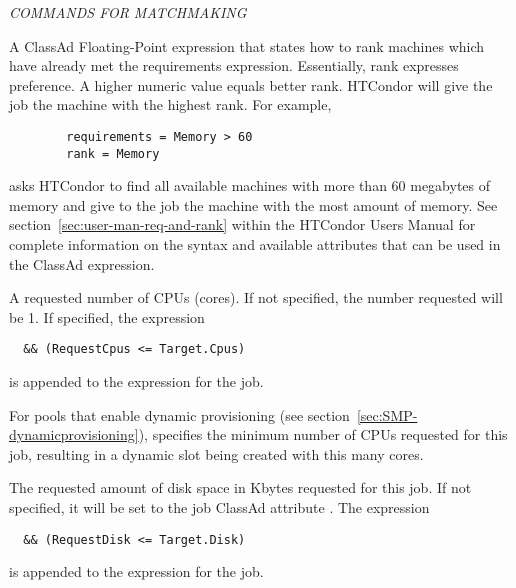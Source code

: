 \emph{COMMANDS FOR MATCHMAKING}
\begin{description} 


\label{man-condor-submit-rank}
\item[rank = $<$ClassAd Float Expression$>$]
A ClassAd Floating-Point
expression that states how to rank machines which have already met the requirements
expression. Essentially, rank expresses preference.  A higher numeric value
equals better rank. HTCondor will give the job the machine with the
highest rank.  For example,
\begin{verbatim}
        requirements = Memory > 60
        rank = Memory
\end{verbatim}
asks HTCondor to find all available machines with more than 60 megabytes of memory
and give to the job the machine with the most amount of memory.
See section~\ref{sec:user-man-req-and-rank} 
within the HTCondor Users
Manual for complete information on the syntax and available attributes
that can be used in the ClassAd expression.


\label{man-condor-submit-request-cpus}
\item[request\_cpus = $<$num-cpus$>$] 
A requested number of CPUs (cores).
If not specified, the number requested will be 1.
If specified, 
the expression
\begin{verbatim}
  && (RequestCpus <= Target.Cpus) 
\end{verbatim}
is appended to the  expression for the job.

For pools that enable
dynamic  provisioning
(see section~\ref{sec:SMP-dynamicprovisioning}),
specifies the minimum number of CPUs requested for this job,
resulting in a dynamic slot being created with this many cores.


\label{man-condor-submit-request-disk}
\item[request\_disk = $<$quantity$>$] 
The requested amount of disk space in Kbytes requested for this job.
If not specified, 
it will be set to the job ClassAd attribute .
The expression
\begin{verbatim}
  && (RequestDisk <= Target.Disk) 
\end{verbatim}
is appended to the  expression for the job.


\end{description}
